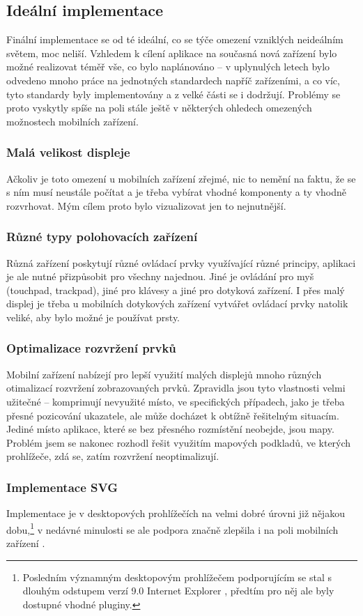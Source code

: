 \subsection{Ideální implementace}
Finální implementace se od té ideální, co se týče omezení vzniklých neideálním světem, moc neliší. Vzhledem k cílení aplikace na současná nová zařízení bylo možné realizovat téměř vše, co bylo naplánováno -- v uplynulých letech bylo odvedeno mnoho práce na jednotných standardech napříč zařízeními, a co víc, tyto standardy byly implementovány a z velké části se i dodržují. Problémy se proto vyskytly spíše na poli stále ještě v některých ohledech omezených možnostech mobilních zařízení.

\subsubsection{Malá velikost displeje}
Ačkoliv je toto omezení u mobilních zařízení zřejmé, nic to nemění na faktu, že se s ním musí neustále počítat a je třeba vybírat vhodné komponenty a ty vhodně rozvrhovat. Mým cílem proto bylo vizualizovat jen to nejnutnější.

\subsubsection{Různé typy polohovacích zařízení}
Různá zařízení poskytují různé ovládací prvky využívající různé principy, aplikaci je ale nutné přizpůsobit pro všechny najednou. Jiné je ovládání pro myš (touchpad, trackpad), jiné pro klávesy a jiné pro dotyková zařízení. I přes malý displej je třeba u mobilních dotykových zařízení vytvářet ovládací prvky natolik veliké, aby bylo možné je používat prsty.

\subsubsection{Optimalizace rozvržení prvků}
Mobilní zařízení nabízejí pro lepší využití malých displejů mnoho různých otimalizací rozvržení zobrazovaných prvků. Zpravidla jsou tyto vlastnosti velmi užitečné -- komprimují nevyužité místo, ve specifických případech, jako je třeba přesné pozicování ukazatele, ale může docházet k obtížně řešitelným situacím. Jediné místo aplikace, které se bez přesného rozmístění neobejde, jsou mapy. Problém jsem se nakonec rozhodl řešit využitím   mapových podkladů, ve kterých prohlížeče, zdá se, zatím rozvržení neoptimalizují.

\subsubsection{Implementace SVG}
Implementace  je v desktopových prohlížečích na velmi dobré úrovni již nějakou dobu,\footnote{Posledním významným desktopovým prohlížečem podporujícím  se stal s dlouhým odstupem verzí 9.0 Internet Explorer \cite{CanIUse}, předtím pro něj ale byly dostupné vhodné pluginy.} v nedávné minulosti se ale podpora značně zlepšila i na poli mobilních zařízení \cite{CanIUse}.

